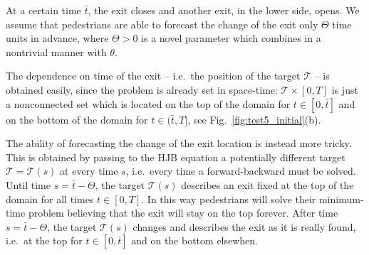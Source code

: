 \documentclass{cmslatex}
\begin{document}
At a certain time $\bar{t}$, the exit closes and another exit, in the lower side, opens.
We assume that pedestrians are able to forecast the change of the exit only $\Theta$ time units in advance, where $\Theta>0$ is a novel parameter which combines in a nontrivial manner with $\theta$.

The dependence on time of the exit -- i.e.\ the position of the target $\mathcal T$ -- is obtained easily, since the problem is already set in space-time: $\mathcal T\times[0,T]$ is just a nonconnected set which is located on the top of the domain for $t\in[0,\bar t]$ and on the bottom of the domain for $t\in(\bar t,T]$, see Fig.\ \ref{fig:test5_initial}(b).

The ability of forecasting the change of the exit location is instead more tricky. 
This is obtained by passing to the HJB equation a potentially different target $\mathcal T=\mathcal T(s)$ at every time $s$, i.e.\ every time a forward-backward must be solved. 
Until time $s=\bar t-\Theta$, the target $\mathcal T(s)$ describes an exit fixed at the top of the domain for all times $t\in[0,T]$. 
In this way pedestrians will solve their minimum-time problem believing that the exit will stay on the top forever. 
After time $s=\bar t-\Theta$, the target $\mathcal T(s)$ changes and describes the exit as it is really found, i.e.\ at the top for $t\in[0,\bar t]$ and on the bottom elsewhen. 
\end{document}
